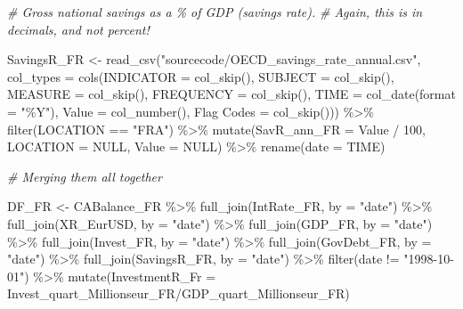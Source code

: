 \documentclass[
]{article}
\newenvironment{Shaded}{\begin{snugshade}}{\end{snugshade}}
\newcommand{\AttributeTok}[1]{\textcolor[rgb]{0.77,0.63,0.00}{#1}}
\newcommand{\CommentTok}[1]{\textcolor[rgb]{0.56,0.35,0.01}{\textit{#1}}}
\newcommand{\ConstantTok}[1]{\textcolor[rgb]{0.00,0.00,0.00}{#1}}
\newcommand{\DecValTok}[1]{\textcolor[rgb]{0.00,0.00,0.81}{#1}}
\newcommand{\FunctionTok}[1]{\textcolor[rgb]{0.00,0.00,0.00}{#1}}
\newcommand{\NormalTok}[1]{#1}
\newcommand{\OtherTok}[1]{\textcolor[rgb]{0.56,0.35,0.01}{#1}}
\newcommand{\SpecialCharTok}[1]{\textcolor[rgb]{0.00,0.00,0.00}{#1}}
\newcommand{\StringTok}[1]{\textcolor[rgb]{0.31,0.60,0.02}{#1}}
\begin{document}
\begin{Shaded}
\begin{Highlighting}[]
\CommentTok{\# Gross national savings as a \% of GDP (savings rate). }
\CommentTok{\# Again, this is in decimals, and not percent!}

\NormalTok{SavingsR\_FR }\OtherTok{\textless{}{-}} \FunctionTok{read\_csv}\NormalTok{(}\StringTok{"sourcecode/OECD\_savings\_rate\_annual.csv"}\NormalTok{, }
    \AttributeTok{col\_types =} \FunctionTok{cols}\NormalTok{(}\AttributeTok{INDICATOR =} \FunctionTok{col\_skip}\NormalTok{(), }
        \AttributeTok{SUBJECT =} \FunctionTok{col\_skip}\NormalTok{(), }\AttributeTok{MEASURE =} \FunctionTok{col\_skip}\NormalTok{(), }
        \AttributeTok{FREQUENCY =} \FunctionTok{col\_skip}\NormalTok{(), }\AttributeTok{TIME =} \FunctionTok{col\_date}\NormalTok{(}\AttributeTok{format =} \StringTok{"\%Y"}\NormalTok{), }
        \AttributeTok{Value =} \FunctionTok{col\_number}\NormalTok{(), }\StringTok{\textasciigrave{}}\AttributeTok{Flag Codes}\StringTok{\textasciigrave{}} \OtherTok{=} \FunctionTok{col\_skip}\NormalTok{())) }\SpecialCharTok{\%\textgreater{}\%}
  \FunctionTok{filter}\NormalTok{(LOCATION }\SpecialCharTok{==} \StringTok{"FRA"}\NormalTok{) }\SpecialCharTok{\%\textgreater{}\%}
  \FunctionTok{mutate}\NormalTok{(}\AttributeTok{SavR\_ann\_FR =}\NormalTok{ Value }\SpecialCharTok{/} \DecValTok{100}\NormalTok{, }\AttributeTok{LOCATION =} \ConstantTok{NULL}\NormalTok{, }\AttributeTok{Value =} \ConstantTok{NULL}\NormalTok{) }\SpecialCharTok{\%\textgreater{}\%}
  \FunctionTok{rename}\NormalTok{(}\AttributeTok{date =}\NormalTok{ TIME)}


\CommentTok{\# Merging them all together}

\NormalTok{DF\_FR }\OtherTok{\textless{}{-}}\NormalTok{ CABalance\_FR }\SpecialCharTok{\%\textgreater{}\%}
  \FunctionTok{full\_join}\NormalTok{(IntRate\_FR, }\AttributeTok{by =} \StringTok{"date"}\NormalTok{) }\SpecialCharTok{\%\textgreater{}\%}
  \FunctionTok{full\_join}\NormalTok{(XR\_EurUSD, }\AttributeTok{by =} \StringTok{"date"}\NormalTok{) }\SpecialCharTok{\%\textgreater{}\%}
  \FunctionTok{full\_join}\NormalTok{(GDP\_FR, }\AttributeTok{by =} \StringTok{"date"}\NormalTok{) }\SpecialCharTok{\%\textgreater{}\%}
  \FunctionTok{full\_join}\NormalTok{(Invest\_FR, }\AttributeTok{by =} \StringTok{"date"}\NormalTok{) }\SpecialCharTok{\%\textgreater{}\%}
  \FunctionTok{full\_join}\NormalTok{(GovDebt\_FR, }\AttributeTok{by =} \StringTok{"date"}\NormalTok{) }\SpecialCharTok{\%\textgreater{}\%}
  \FunctionTok{full\_join}\NormalTok{(SavingsR\_FR, }\AttributeTok{by =} \StringTok{"date"}\NormalTok{) }\SpecialCharTok{\%\textgreater{}\%}
  \FunctionTok{filter}\NormalTok{(date }\SpecialCharTok{!=} \StringTok{"1998{-}10{-}01"}\NormalTok{) }\SpecialCharTok{\%\textgreater{}\%}
  \FunctionTok{mutate}\NormalTok{(}\AttributeTok{InvestmentR\_Fr =}\NormalTok{ Invest\_quart\_Millionseur\_FR}\SpecialCharTok{/}\NormalTok{GDP\_quart\_Millionseur\_FR)}



\end{Highlighting}
\end{Shaded}
\end{document}
